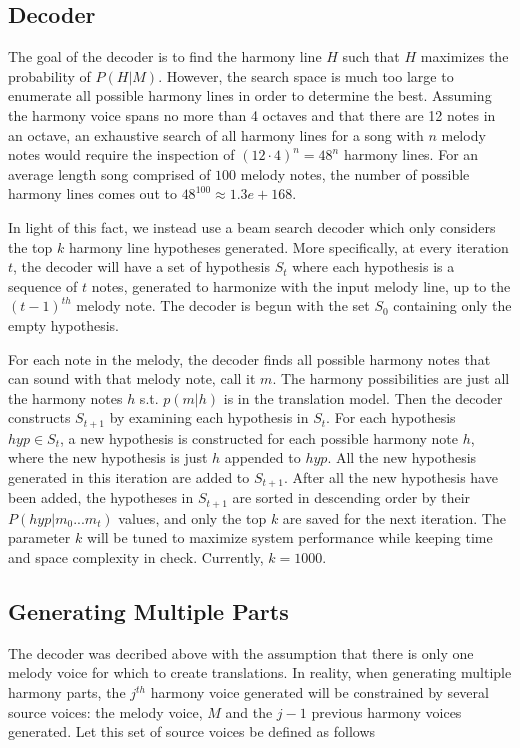 \documentclass{sig-alternate}
\begin{document}
\subsection {Decoder}
The goal of the decoder is to find the harmony line $H$ such that $H$ maximizes the probability of $P(H | M)$. However, the search space is much too large to enumerate all possible harmony lines in order to determine the best. Assuming the harmony voice spans no more than 4 octaves and that there are 12 notes in an octave, an exhaustive search of all harmony lines for a song with $n$ melody notes would require the inspection of $(12\cdot 4)^{n} = 48^{n}$ harmony lines. For an average length song comprised of $100$ melody notes, the number of possible harmony lines comes out to $48^{100} \approx 1.3e+168$. 

In light of this fact, we instead use a beam search decoder which only considers the top $k$ harmony line hypotheses generated. More specifically, at every iteration $t$, the decoder will have a set of hypothesis $S_{t}$ where each hypothesis is a sequence of $t$ notes, generated to harmonize with the input melody line, up to the $(t - 1)^{th}$ melody note. The decoder is begun with the set $S_{0}$ containing only the empty hypothesis. 

For each note in the melody, the decoder finds all possible harmony notes that can sound with that melody note, call it $m$. The harmony possibilities are just all the harmony notes $h$ s.t. $p(m | h)$ is in the translation model. Then the decoder constructs $S_{t + 1}$ by examining each hypothesis in $S_{t}$. For each hypothesis $hyp \in S_{t}$, a new hypothesis is constructed for each possible harmony note $h$, where the new hypothesis is just $h$ appended to $hyp$. All the new hypothesis generated in this iteration are added to $S_{t + 1}$. After all the new hypothesis have been added, the hypotheses in $S_{t + 1}$ are sorted in descending order by their $P(hyp | m_{0} ... m_{t})$ values, and only the top $k$ are saved for the next iteration.
The parameter $k$ will be tuned to maximize system performance while keeping time and space complexity in check. Currently, $k = 1000$.

\subsection {Generating Multiple Parts}
The decoder was decribed above with the assumption that there is only one melody voice for  which to create translations. In reality, when generating multiple harmony parts, the $j^{th}$ harmony voice generated will be constrained by several source voices: the melody voice, $M$ and the $j-1$ previous harmony voices generated. Let this set of source voices be defined as follows\\
\end{document}
